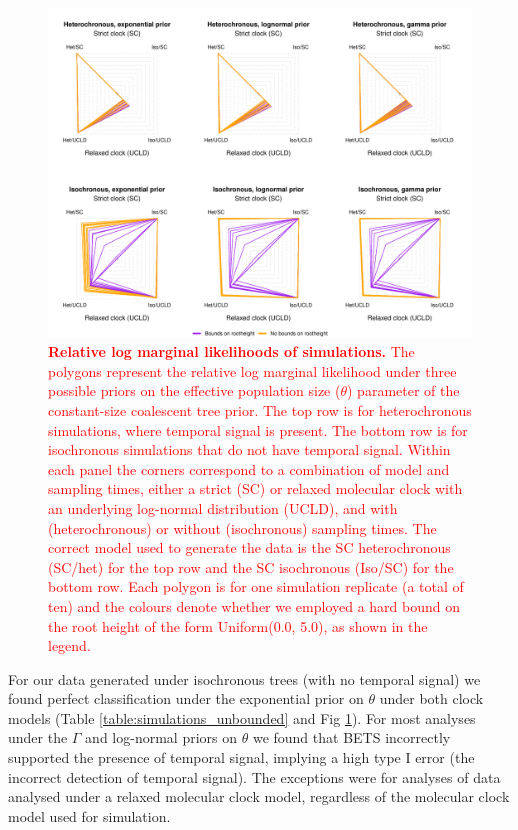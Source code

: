 \documentclass[10pt,letterpaper]{article}
\begin{document}
\begin{figure}[!h]
	\begin{center}
		\includegraphics[width=14cm]{sandbox_figures/figure_2.pdf}\newline
		\vspace{-0.3cm}
		\caption{\textcolor{red}{\textbf{Relative log marginal likelihoods of simulations.} The polygons represent the relative log marginal likelihood under three possible priors on the effective population size ($\theta$) parameter of the constant-size coalescent tree prior. The top row is for heterochronous simulations, where temporal signal is present. The bottom row is for isochronous simulations that do not have temporal signal. Within each panel the corners correspond to a combination of model and sampling times, either a strict (SC) or relaxed molecular clock with an underlying log-normal distribution (UCLD), and with (heterochronous) or without (isochronous) sampling times. The correct model used to generate the data is the SC heterochronous (SC/het) for the top row and the SC isochronous (Iso/SC) for the bottom row. Each polygon is for one simulation replicate (a total of ten) and the colours denote whether we employed a hard bound on the root height of the form Uniform(0.0, 5.0), as shown in the legend.}}
		\label{figure:SC_polygons}
	\end{center}
\end{figure}

For our data generated under isochronous trees (with no temporal signal) we found perfect classification under the exponential prior on $\theta$ under both clock models (Table \ref{table:simulations_unbounded} and Fig \ref{figure:SC_polygons}). For most analyses under the $\Gamma$ and log-normal priors on $\theta$ we found that BETS incorrectly supported the presence of temporal signal, implying a high type I error (the incorrect detection of temporal signal). The exceptions were for analyses of data analysed under a relaxed molecular clock model, regardless of the molecular clock model used for simulation. 
\end{document}
